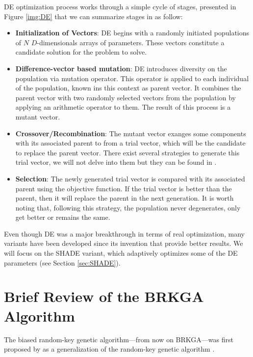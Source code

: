 \documentclass[review]{elsarticle}
\begin{document}
DE optimization process works through a simple cycle of stages, presented in Figure \ref{img:DE} that we can summarize stages in as follow:

\begin{itemize}
	
	\item \textbf{Initialization of Vectors}: DE begins with a randomly initiated populations of $N$ $D$-dimensionals arrays of parameters. These vectors constitute a candidate solution for the problem to solve.
	
	\item \textbf{Difference-vector based mutation}: DE introduces diversity on the population via mutation operator. This operator is applied to each individual of the population, known ins this context as parent vector. It combines the parent vector with two randomly selected vectors from the population by applying an arithmetic operator to them. The result of this process is a mutant vector.
	
	\item \textbf{Crossover/Recombination}: The mutant vector exanges some components with its associated parent to from a trial vector, which will be the candidate to replace the parent vector. There exist several strategies to generate this trial vector, we will not delve into them but they can be found in \cite{das2011differential}.
	
	\item \textbf{Selection}: The newly generated trial vector is compared with its associated parent using the objective function. If the trial vector is better than the parent, then it will replace the parent in the next generation. It is worth noting that, following this strategy, the population never degenerates, only get better or remains the same.
	
\end{itemize}

Even though DE was a major breakthrough in terms of real optimization, many variants have been developed since its invention that provide better results. We will focus on the SHADE variant, which adaptively optimizes some of the DE parameters (see Section \ref{sec:SHADE}).


\section{Brief Review of the BRKGA Algorithm}

The biased random-key genetic algorithm---from now on BRKGA---was first proposed by \cite{gonccalves2011biased} as a generalization of the random-key genetic algorithm \cite{bean1994genetic}.
\end{document}
